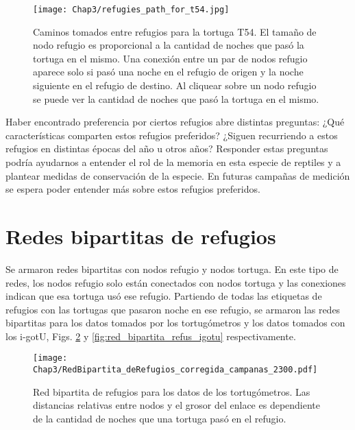 \begin{figure}[ht]
    \begin{center}
        \texttt{[image: Chap3/refugies\_path\_for\_t54.jpg]}
        \caption[Caminos tomados entre refugios para la tortuga T54.]{Caminos tomados entre refugios para la tortuga T54. El tamaño de nodo refugio es proporcional a la cantidad de noches que pasó la tortuga en el mismo. Una conexión entre un par de nodos refugio aparece solo si pasó una noche en el refugio de origen y la noche siguiente en el refugio de destino. Al cliquear sobre un nodo refugio se puede ver la cantidad de noches que pasó la tortuga en el mismo.}
        \label{fig:ruta_refus_T54}
       
        \end{center}
\end{figure}
Haber encontrado preferencia por ciertos refugios abre distintas preguntas: ¿Qué características comparten estos refugios preferidos? ¿Siguen recurriendo a estos refugios en distintas épocas del año u otros años?  Responder estas preguntas podría ayudarnos a entender el rol de la memoria en esta especie de reptiles y a plantear medidas de conservación de la especie. En futuras campañas de medición se espera poder entender más sobre estos refugios preferidos.
 
 
 
\section{Redes bipartitas de refugios}
Se armaron redes bipartitas con nodos refugio y nodos tortuga. En este tipo de redes, los nodos refugio solo están conectados con nodos tortuga y las conexiones indican que esa tortuga usó ese refugio. Partiendo de todas las etiquetas de refugios con las tortugas que pasaron noche en ese refugio, se armaron las redes bipartitas para los datos tomados por los tortugómetros y los datos tomados con los i-gotU, Figs. \ref{fig:red_bipartita_refus_campanas} y \ref{fig:red_bipartita_refus_igotu} respectivamente.
 
\begin{figure}[ht]
    \begin{center}
        \texttt{[image: Chap3/RedBipartita\_deRefugios\_corregida\_campanas\_2300.pdf]}
        \caption[Red bipartita de refugios para los datos de los tortugómetros.]{Red bipartita de refugios para los datos de los tortugómetros. Las distancias relativas entre nodos y el grosor del enlace es dependiente de la cantidad de noches que una  tortuga pasó en el refugio. }
        \label{fig:red_bipartita_refus_campanas}
       
        \end{center}
\end{figure}
 
